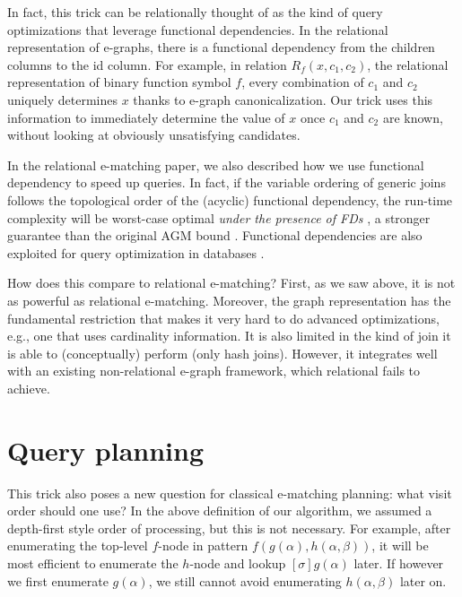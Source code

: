 In fact, this trick can be relationally thought of as the kind of query
 optimizations that leverage functional dependencies.
In the relational representation of e-graphs,
 there is a functional dependency from the
 children columns to the id column.
For example, in relation
 \(R_f(x, c_1, c_2)\), the relational representation of binary function
 symbol \(f\), every combination of \(c_1\) and \(c_2\) uniquely
 determines \(x\) thanks to e-graph canonicalization.
Our trick uses this
 information to immediately determine the value of \(x\) once \(c_1\) and
 \(c_2\) are known, without looking at obviously unsatisfying candidates.

In the relational e-matching paper,
 we also described how we use
 functional dependency to speed up queries.
In fact, if the variable
 ordering of generic joins follows the topological order of the (acyclic)
 functional dependency,
 the run-time complexity will be worst-case
 optimal \textit{under the presence of FDs} \citep{wcoj-survey}, 
 a stronger guarantee than the original
 AGM bound \citep{agm}.
Functional dependencies are also exploited
 for query optimization in databases \citep{data-dep-for-opt-survey}.

How does this compare to relational e-matching? 
First, as we saw above,
 it is not as powerful as relational e-matching.
Moreover, 
 the graph representation has the fundamental restriction 
 that makes it very hard
 to do advanced optimizations, 
 e.g., one that uses cardinality information.
It is also limited in the kind of join it is able to
 (conceptually) perform (only hash joins).
However, 
 it integrates well
 with an existing non-relational e-graph framework,
 which relational \ematching fails to achieve.

\section{Query planning}\label{query-planning}

This trick also poses a new question for classical e-matching planning:
what visit order should one use? In the above definition of our algorithm,
 we assumed a depth-first style order of processing, but this is not
 necessary.
For example,
 after enumerating the top-level \(f\)-node in
 pattern \(f(g(\alpha), h(\alpha, \beta))\), it will be most efficient to
 enumerate the \(h\)-node and lookup \([\sigma]g(\alpha)\) later.
If however we first enumerate \(g(\alpha)\),
we still cannot avoid enumerating \(h(\alpha,\beta)\) later on.

